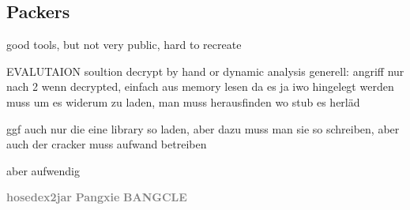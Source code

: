 \subsection{Packers}
\label{subsection:evaluation-reengineering-packers}

good tools, but not very public, hard to recreate


%
EVALUTAION\newline
soultion decrypt by hand or dynamic analysis\newline
generell: angriff nur nach 2 wenn decrypted, einfach aus memory lesen da es ja iwo hingelegt werden muss um es widerum zu laden, man muss herausfinden wo stub es herläd\newline

ggf auch nur die eine library so laden, aber dazu muss man sie so schreiben, aber auch der cracker muss aufwand betreiben\newline

aber aufwendig
%

\newline\newline\textbf{\textcolor{gray}{hosedex2jar}}\newline
\newline\newline\textbf{\textcolor{gray}{Pangxie}}\newline
\newline\newline\textbf{\textcolor{gray}{BANGCLE}}\newline
